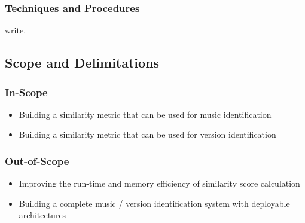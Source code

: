 \documentclass[../main.tex]{subfiles}
\begin{document}
\subsubsection{Techniques and Procedures}
write.



\iffalse
\subsection{Significance of the Project}
\par
Music, being tightly coupled to the flow of time has complex dynamics which it is built upon. Current techniques available for music identification, and version identification do not consider this aspect of music. Therefore more work must be done in this area to explore the usability of this aspect of music to build music and version identification systems. 

\par
Furthermore, the dynamical properties have the potential to reveal patterns inherent to certain composers, genres, cultures, time periods etc. from musical works, which would act as a new basis to conduct more research in the \gls{MIR} domain.
\fi


\subsection{Scope and Delimitations}

\subsubsection{In-Scope}
\begin{itemize}
    \item Building a similarity metric that can be used for music identification
    \item Building a similarity metric that can be used for version identification
\end{itemize}

\subsubsection{Out-of-Scope}
\begin{itemize}
    \item Improving the run-time and memory efficiency of similarity score calculation
    \item Building a complete music / version identification system with deployable architectures
\end{itemize}
\end{document}
